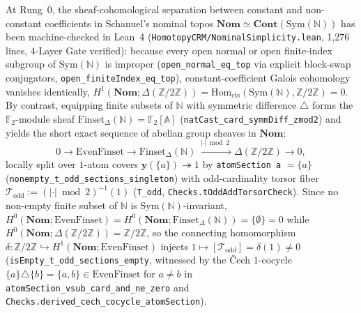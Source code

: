 \documentclass[10pt,twoside,openright]{book}
\theoremstyle{crmplain}
\theoremstyle{crmdef}
\theoremstyle{crmremark}
\begin{document}
At Rung~0, the sheaf-cohomological separation between constant and non-constant coefficients in Schanuel's nominal topos $\mathbf{Nom} \simeq \mathbf{Cont}(\mathrm{Sym}(\mathbb{N}))$ has been machine-checked in Lean~4 (\texttt{HomotopyCRM/\allowbreak Nominal\allowbreak Simplicity.lean}, 1,276 lines, 4-Layer Gate verified): because every open normal or open finite-index subgroup of $\mathrm{Sym}(\mathbb{N})$ is improper (\texttt{open\_\allowbreak normal\_\allowbreak eq\_\allowbreak top} via explicit block-swap conjugators, \texttt{open\_\allowbreak finiteIndex\_\allowbreak eq\_\allowbreak top}), constant-coefficient Galois cohomology vanishes identically, $H^1(\mathbf{Nom}; \Delta(\mathbb{Z}/2\mathbb{Z})) = \mathrm{Hom}_{\mathrm{cts}}(\mathrm{Sym}(\mathbb{N}), \mathbb{Z}/2\mathbb{Z}) = 0$. By contrast, equipping finite subsets of $\mathbb{N}$ with symmetric difference $\triangle$ forms the $\mathbb{F}_2$-module sheaf $\mathrm{Finset}_\Delta(\mathbb{N}) = \mathbb{F}_2[\mathbb{A}]$ (\texttt{natCast\_\allowbreak card\_\allowbreak symmDiff\_\allowbreak zmod2}) and yields the short exact sequence of abelian group sheaves in $\mathbf{Nom}$:
\[
  0 \longrightarrow \mathrm{EvenFinset} \longrightarrow \mathrm{Finset}_\Delta(\mathbb{N}) \xrightarrow{\;|\cdot|\bmod 2\;} \Delta(\mathbb{Z}/2\mathbb{Z}) \longrightarrow 0,
\]
locally split over $1$-atom covers $\mathbf{y}(\{a\}) \twoheadrightarrow 1$ by \texttt{atomSection a} $= \{a\}$ (\texttt{nonempty\_\allowbreak t\_\allowbreak odd\_\allowbreak sections\_\allowbreak singleton}) with odd-cardinality torsor fiber $\mathcal{T}_{\mathrm{odd}} := (|\cdot|\bmod 2)^{-1}(1)$ (\texttt{T\_\allowbreak odd}, \texttt{Checks.\allowbreak tOdd\allowbreak AddTorsor\allowbreak Check}). Since no non-empty finite subset of $\mathbb{N}$ is $\mathrm{Sym}(\mathbb{N})$-invariant, $H^0(\mathbf{Nom}; \mathrm{EvenFinset}) = H^0(\mathbf{Nom}; \mathrm{Finset}_\Delta(\mathbb{N})) = \{\emptyset\} = 0$ while $H^0(\mathbf{Nom}; \Delta(\mathbb{Z}/2\mathbb{Z})) = \mathbb{Z}/2\mathbb{Z}$, so the connecting homomorphism $\delta : \mathbb{Z}/2\mathbb{Z} \hookrightarrow H^1(\mathbf{Nom}; \mathrm{EvenFinset})$ injects $1 \mapsto [\mathcal{T}_{\mathrm{odd}}] = \delta(1) \neq 0$ (\texttt{isEmpty\_\allowbreak t\_\allowbreak odd\_\allowbreak sections\_\allowbreak empty}, witnessed by the Čech $1$-cocycle $\{a\} \triangle \{b\} = \{a, b\} \in \mathrm{EvenFinset}$ for $a \neq b$ in \texttt{atomSection\_\allowbreak vsub\_\allowbreak card\_\allowbreak and\_\allowbreak ne\_\allowbreak zero} and \texttt{Checks.\allowbreak derived\_\allowbreak cech\_\allowbreak cocycle\_\allowbreak atom\allowbreak Section}).
\end{document}
